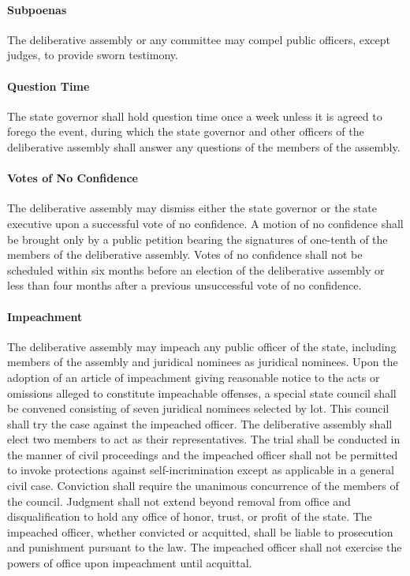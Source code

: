 \documentclass{article}
\begin{document}
\paragraph{Subpoenas}
The deliberative assembly or any committee may compel public officers, except judges, to provide sworn testimony.
\paragraph{Question Time}
The state governor shall hold question time once a week unless it is agreed to forego the event, during which the state governor and other officers of the deliberative assembly shall answer any questions of the members of the assembly.
\paragraph{Votes of No Confidence}
The deliberative assembly may dismiss either the state governor or the state executive upon a successful vote of no confidence. A motion of no confidence shall be brought only by a public petition bearing the signatures of one-tenth of the members of the deliberative assembly. Votes of no confidence shall not be scheduled within six months before an election of the deliberative assembly or less than four months after a previous unsuccessful vote of no confidence.
\paragraph{Impeachment}
The deliberative assembly may impeach any public officer of the state, including members of the assembly and juridical nominees as juridical nominees. Upon the adoption of an article of impeachment giving reasonable notice to the acts or omissions alleged to constitute impeachable offenses, a special state council shall be convened consisting of seven juridical nominees selected by lot. This council shall try the case against the impeached officer. The deliberative assembly shall elect two members to act as their representatives. The trial shall be conducted in the manner of civil proceedings and the impeached officer shall not be permitted to invoke protections against self-incrimination except as applicable in a general civil case. Conviction shall require the unanimous concurrence of the members of the council. Judgment shall not extend beyond removal from office and disqualification to hold any office of honor, trust, or profit of the state. The impeached officer, whether convicted or acquitted, shall be liable to prosecution and punishment pursuant to the law. The impeached officer shall not exercise the powers of office upon impeachment until acquittal.
\end{document}
